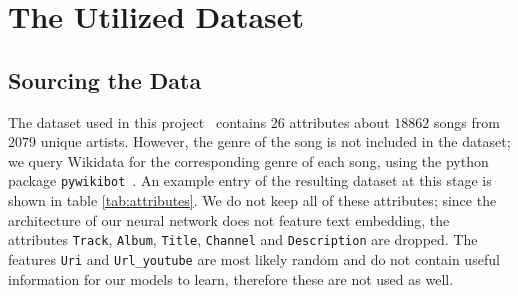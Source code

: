\documentclass[
  12pt,
  bibliography=totoc,     %
  captions=tableheading,  %
  titlepage=firstiscover, %
]{scrartcl}
\begin{document}
\section{The Utilized Dataset}
\subsection{Sourcing the Data}
The dataset used in this project~\cite{Datensatz} contains $26$ attributes about $18862$ songs from $2079$ unique artists.
However, the genre of the song is not included in the dataset; we query Wikidata for the corresponding genre of each song,
using the python package \texttt{pywikibot}~\cite{pywikibot}. An example entry of the resulting dataset at this stage
is shown in table \ref{tab:attributes}. We do not keep all of these attributes; since the architecture of our
neural network does not feature text embedding, the attributes \texttt{Track}, \texttt{Album}, \texttt{Title}, \texttt{Channel} and
\texttt{Description} are dropped. The features \texttt{Uri} and \texttt{Url\_youtube} are most likely random and do not contain
useful information for our models to learn, therefore these are not used as well.
\FloatBarrier
\end{document}
